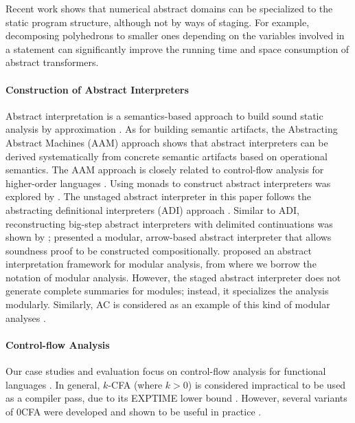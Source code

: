 Recent work shows that numerical abstract domains can be
specialized to the static program structure, although not by
ways of staging. For example, decomposing polyhedrons
\cite{DBLP:conf/popl/SinghPV17, Singh:2017:PCD:3177123.3158143} to
smaller ones depending on the variables involved in a statement can
significantly improve the running time and space consumption of abstract
transformers.

\paragraph{Construction of Abstract Interpreters} Abstract interpretation is a
semantics-based approach to build sound static analysis by approximation
\cite{DBLP:conf/popl/CousotC77, Cousot98-5}.
As for building semantic artifacts, the Abstracting Abstract Machines (AAM)
\cite{DBLP:journals/jfp/HornM12, DBLP:conf/icfp/HornM10} approach shows that
abstract interpreters can be derived systematically from concrete semantic
artifacts based on operational semantics.
The AAM approach is closely related to control-flow analysis for higher-order languages
\cite{Midtgaard:2012:CAF:2187671.2187672, Shivers:1991:SSC:115865.115884}.
Using monads to construct abstract interpreters was explored by
\citet{Sergey:2013:MAI:2491956.2491979, DBLP:journals/pacmpl/DaraisLNH17,
Darais:2015:GTM:2814270.2814308}.
The unstaged abstract interpreter in this paper follows the abstracting
definitional interpreters (ADI) approach \cite{DBLP:journals/pacmpl/DaraisLNH17}.  
Similar to ADI, reconstructing
big-step abstract interpreters with delimited continuations was shown by
\citet{Wei:2018:RAA:3243631.3236800}; \citet{Keidel:2018:CSP:3243631.3236767}
presented a modular, arrow-based abstract interpreter that allows soundness
proof to be constructed compositionally.
\citet{DBLP:conf/cc/CousotC02} proposed an abstract interpretation framework for
modular analysis, from where we borrow the notation of modular analysis.
However, the staged abstract interpreter does not generate complete summaries for
modules; instead, it specializes the analysis modularly. Similarly, AC
is considered as an example of this kind of modular analyses \cite{DBLP:conf/cc/CousotC02}.

\paragraph{Control-flow Analysis} Our case studies and evaluation focus on
control-flow analysis for functional languages
\cite{Shivers:1991:SSC:115865.115884, Midtgaard:2012:CAF:2187671.2187672}. In
general, $k$-CFA (where $k > 0$) is considered impractical to be used as a
compiler pass, due to its EXPTIME lower bound
\cite{VanHorn:2008:DKC:1411204.1411243}.  However, several variants of 0CFA
were developed and shown to be useful in practice
\cite{Adams:2011:FTR:2048066.2048105, Bergstrom:2014:PEH:2628136.2628153,
ashley:practical, Reppy:2006:TCA:1159876.1159888}.

